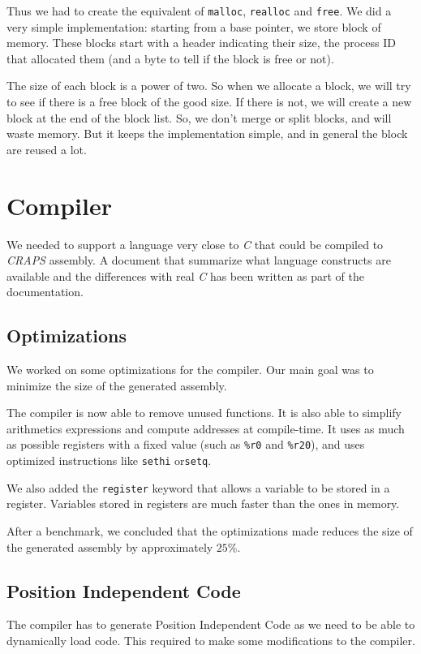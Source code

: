 \documentclass[openany, a4paper]{book}
\begin{document}
      Thus we had to create the equivalent of \verb+malloc+, \verb+realloc+ and
      \verb+free+. We did a very
      simple implementation: starting from a base pointer, we store block of
      memory. These blocks start with a header indicating their size, the
      process ID that allocated them (and a byte to tell if the block is free or
      not).

      The size of each block is a power of two. So when we allocate a block, we
      will try to see if there is a free block of the good size. If there is
      not, we will create a new block at the end of the block list.
      So, we don't merge or split blocks, and will waste memory. But it keeps
      the implementation simple, and in general the block are reused a lot.

    \section{Compiler}
      We needed to support a language very close to \textit{C} that could be
      compiled to \emph{CRAPS} assembly.
      A document that summarize what language constructs are available and the
      differences with real \textit{C }has been written as part of the
      documentation.

      \subsection{Optimizations}
        We worked on some optimizations for the compiler. Our main goal was to
        minimize the size of the generated assembly.

        The compiler is now able to remove unused functions. It is also able to
        simplify arithmetics expressions and compute addresses at compile-time.
        It uses as much as possible registers with a fixed value (such as
        \verb+%r0+ and \verb+%r20+), and uses optimized instructions like
        \verb+sethi+ or\verb+setq+.

        We also added the \verb+register+ keyword that allows a variable to
        be stored in a register. Variables stored in registers are much faster
        than the ones in memory.

        After a benchmark, we concluded that the optimizations made reduces the
        size of the generated assembly by approximately $25\%$.

      \subsection{Position Independent Code}
        The compiler has to generate Position Independent Code as we need to be
        able to dynamically load code. This required to make some modifications
        to the compiler.
\end{document}
